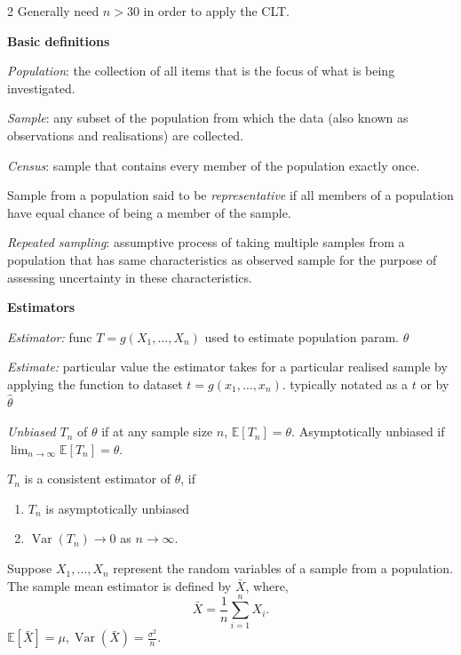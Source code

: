 \documentclass[10pt]{extarticle}
\theoremstyle{definition}
\theoremstyle{remark}
\newcommand{\E}{\mathbb{E}}
\DeclareMathOperator{\Var}{Var}
\begin{document}
\begin{multicols}{2}
    Generally need $n > 30$ in order to apply the CLT. 


    \noindent
    {\large\textbf{Basic definitions}}

    \textit{Population}: the collection of all items that is the focus of what
    is being investigated. 

    \textit{Sample}: any subset of the population from which the data (also
    known as observations and realisations) are collected. 

    \textit{Census}: sample that contains every member of the population
    exactly once. 

    Sample from a population said to be \textit{representative} if all members
    of a population have equal chance of being a member of the sample. 

    \textit{Repeated sampling}: assumptive process of taking multiple samples
    from a population that has same characteristics as observed sample for the
    purpose of assessing uncertainty in these characteristics.


    \noindent
    {\large\textbf{Estimators}}

    \textit{Estimator:} func $ T = g(X_1, \ldots, X_n) $ used to estimate 
    population param. $\theta$

    \textit{Estimate:} particular value the estimator takes for a particular
    realised sample by applying the function to dataset $t = g(x_1, \ldots,
    x_n)$. typically notated as a $t$ or by $\hat{\theta}$

    \textit{Unbiased} $T_n$ of $\theta$ if at any sample size $n$, $\E[T_n] = \theta$.
    Asymptotically unbiased if $\lim_{n \to \infty} \E[T_n] = \theta$.

    $T_n$ is a consistent estimator of $\theta$, if 
    \begin{enumerate}[noitemsep]
        \item $T_n$ is asymptotically unbiased
        \item $\Var(T_n) \to 0$ as $n \to \infty$. 
    \end{enumerate}

    Suppose $X_1 , \ldots , X_n$ represent the random variables of a sample
    from a population. The sample mean estimator is defined by $\bar{X}$, where,
    \[
        \bar{X} = \frac{1}{n} \sum_{i=1}^n X_i.
    \] $\E[\bar{X}] = \mu, \Var(\bar{X}) = \frac{\sigma^2}{n}.$


\end{multicols}
\end{document}
